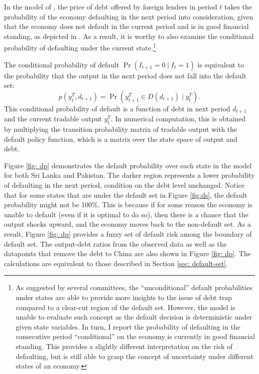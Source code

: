 In the model of \citet{Na-18}, the price of debt offered by foreign lenders in period $t$ takes the probability of the economy defaulting in the next period into consideration, given that the economy does not default in the current period and is in good financial standing, as depicted in .
As a result, it is worthy to also examine the conditional probability of defaulting under the current state.\footnote{%
    As suggested by several committees, the ``unconditional'' default probabilities under states are able to provide more insights to the issue of debt trap compared to a clear-cut region of the default set. However, the model is unable to evaluate such concept as the default decision is deterministic under given state variables. In turn, I report the probability of defaulting in the consecutive period ``conditional'' on the economy is currently in good financial standing. This provides a slightly different interpretation on the risk of defaulting, but is still able to grasp the concept of uncertainty under different states of an economy.
}

The conditional probability of default $\Pr (I_{t+1} = 0 \mid I_{t} = 1)$ is equivalent to the probability that the output in the next period does not fall into the default set:
\begin{equation*}
    p(y^T_t, d_{t+1}) = \Pr (y^T_{t+1} \in D(d_{t+1}) \mid y^T_t).
\end{equation*}
This conditional probability of default is a function of debt in next period $d_{t+1}$ and the current tradable output $y^T_t$.
In numerical computation, this is obtained by multiplying the transition probability matrix of tradable output with the default policy function, which is a matrix over the state space of output and debt.

Figure \ref{fig: dp} demonstrates the default probability over each state in the model for both Sri Lanka and Pakistan. The darker region represents a lower probability of defaulting in the next period, condition on the debt level unchanged. Notice that for some states that are under the default set in Figure \ref{fig:ds}, the default probability might not be 100\%. This is because if for some reason the economy is unable to default (even if it is optimal to do so), then there is a chance that the output shocks upward, and the economy moves back to the non-default set. As a result, Figure \ref{fig: dp} provides a fuzzy set of default risk among the boundary of default set.
The output-debt ratios from the observed data as well as the datapoints that remove the debt to China are also shown in Figure \ref{fig: dp}. The calculations are equivalent to those described in Section \ref{sec: default-set}.

